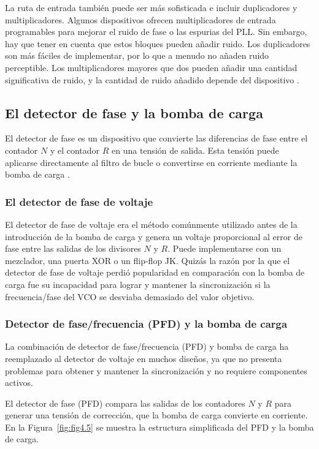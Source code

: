 La ruta de entrada también puede ser más sofisticada e incluir duplicadores y multiplicadores. Algunos dispositivos ofrecen multiplicadores de entrada programables para mejorar el ruido de fase o las espurias del PLL. Sin embargo, hay que tener en cuenta que estos bloques pueden añadir ruido. Los duplicadores son más fáciles de implementar, por lo que a menudo no añaden ruido perceptible. Los multiplicadores mayores que dos pueden añadir una cantidad significativa de ruido, y la cantidad de ruido añadido depende del dispositivo \cite{Dean Banerjee}.

\subsection{El detector de fase y la bomba de carga}
El detector de fase es un dispositivo que convierte las diferencias de fase entre el contador $N$ y el contador $R$ en una tensión de salida. Esta tensión puede aplicarse directamente al filtro de bucle o convertirse en corriente mediante la bomba de carga \cite{Dean Banerjee}.

\subsubsection{El detector de fase de voltaje}
El detector de fase de voltaje era el método comúnmente utilizado antes de la introducción de la bomba de carga y genera un voltaje proporcional al error de fase entre las salidas de los divisores $N$ y $R$. Puede implementarse con un mezclador, una puerta XOR o un flip-flop JK. Quizás la razón por la que el detector de fase de voltaje perdió popularidad en comparación con la bomba de carga fue su incapacidad para lograr y mantener la sincronización si la frecuencia/fase del VCO se desviaba demasiado del valor objetivo.

\subsubsection{Detector de fase/frecuencia (PFD) y la bomba de carga}
La combinación de detector de fase/frecuencia (PFD) y bomba de carga ha reemplazado al detector de voltaje en muchos diseños, ya que no presenta problemas para obtener y mantener la sincronización y no requiere componentes activos.

El detector de fase (PFD) compara las salidas de los contadores $N$ y $R$ para generar una tensión de corrección, que la bomba de carga convierte en corriente. En la Figura~\ref{fig:fig4.5} se muestra la estructura simplificada del PFD y la bomba de carga.

